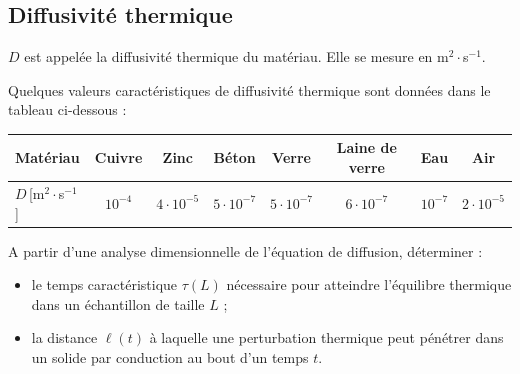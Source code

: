 \documentclass[11pt,fleqn]{book} %
\begin{document}
\subsection{Diffusivité thermique}

\begin{definition}
	$D$ est appelée la diffusivité thermique du matériau. Elle se mesure en m$^2 \cdot$s$^{-1}$.
\end{definition}

Quelques valeurs caractéristiques de diffusivité thermique sont données dans le tableau ci-dessous :
\begin{table}[htbp]
	\centering \begin{tabular}{lccccccc}
		\toprule
		Matériau & Cuivre & Zinc & Béton & Verre & Laine de verre & Eau & Air \\
		\midrule
		$D$\,[m$^2 \cdot$s$^{-1}$] & $10^{-4}$ & $4 \cdot 10^{-5}$ & $5 \cdot 10^{-7}$ & $5 \cdot 10^{-7}$ & $6 \cdot 10^{-7}$ & $10^{-7}$ & $2 \cdot 10^{-5}$ \\
		\bottomrule
	\end{tabular}
\end{table}

\begin{capex}
	A partir d'une analyse dimensionnelle de l'équation de diffusion, déterminer :
	\begin{itemize}
		\item le temps caractéristique $\tau(L)$ nécessaire pour atteindre l'équilibre thermique dans un échantillon de taille $L$ ;
		\item la distance $\ell(t)$ à laquelle une perturbation thermique peut pénétrer dans un solide par conduction au bout d'un temps $t$.
	\end{itemize}
\end{capex}
\end{document}
